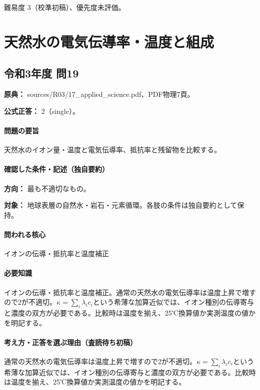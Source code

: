 \par 難易度 3（校準初稿）、優先度未評価。

\section{天然水の電気伝導率・温度と組成}

\subsection{令和3年度 問19}
\label{q:r03-reg-applied-19}

\noindent\textbf{原典：} sources/R03/17\_applied\_science.pdf、PDF物理7頁。

\textbf{公式正答：} 2（single）。

\paragraph{問題の要旨} 天然水のイオン量・温度と電気伝導率、抵抗率と残留物を比較する。

\paragraph{確認した条件・記述（独自要約）}\mbox{}\par

\noindent\textbf{方向：} 最も不適切なもの。\par

\noindent\textbf{対象：} 地球表層の自然水・岩石・元素循環。各肢の条件は独自要約として保持。\par

\paragraph{問われる核心} イオンの伝導・抵抗率と温度補正

\paragraph{必要知識} イオンの伝導・抵抗率と温度補正。通常の天然水の電気伝導率は温度上昇で増すので2が不適切。\(\kappa=\sum_i \lambda_i c_i\)という希薄な加算近似では、イオン種別の伝導寄与と濃度の双方が必要である。比較時は温度を揃え、25℃換算値か実測温度の値かを明記する。

\paragraph{考え方・正答を選ぶ理由（査読待ち初稿）} 通常の天然水の電気伝導率は温度上昇で増すので2が不適切。\(\kappa=\sum_i \lambda_i c_i\)という希薄な加算近似では、イオン種別の伝導寄与と濃度の双方が必要である。比較時は温度を揃え、25℃換算値か実測温度の値かを明記する。

